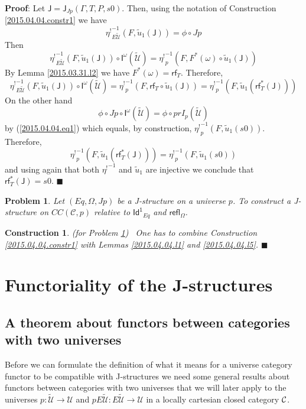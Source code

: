 \documentclass[12pt]{article}
\numberwithin{equation}{section}
\newenvironment{myproof}{{\bf Proof}:}{$\blacksquare$ \vskip 5mm }
\newtheorem{problem}[proposition]{Problem}
\newtheorem{construction0}[proposition]{Construction}
\newenvironment{construction}[1]{\begin{construction0}(for Problem \ref{#1})\ }{$\blacksquare$ \end{construction0}}
\newcommand{\llabel}[1]{\label{#1}}
\newcommand{\sr}{\rightarrow}
\newcommand{\wt}{\widetilde}
\newcommand{\toCC}{CC} %
\newcommand{\Id}{\mathsf{Id^1}} %
\newcommand{\refl}{\mathsf{refl}}
\newcommand{\J}{\mathsf{J}}
\newcommand{\U}{\mathcal{U}}
\newcommand{\I}{\mathsf{I}}
\newcommand{\rf}{\mathsf{rf}}
\newcommand{\etashriek}{\eta^!}
\newcommand{\etaunshriek}{{\etashriek}^{-1}}
\begin{document}
%
\begin{myproof}
Let $\J=\J_{Jp}(\Gamma,T,P,s0)$. Then, using the notation of Construction
\ref{2015.04.04.constr1} we have
%
$$\etaunshriek_{E\wt{\U}}(F,\wt{u}_1(\J))=\phi\circ Jp$$
%
Then
%
$$\etaunshriek_{E\wt{\U}}(F,\wt{u}_1(\J))\circ
\I^{\omega}(\wt{\U})=\etaunshriek_p(F,F^*(\omega)\circ \wt{u}_1(\J))$$
%
By Lemma \ref{2015.03.31.l2} we have $F^*(\omega)=\rf_T$. Therefore,
%
$$\etaunshriek_{E\wt{\U}}(F,\wt{u}_1(\J))\circ \I^{\omega}(\wt{\U})=\etaunshriek_p(F,\rf_T\circ
\wt{u}_1(\J))=\etaunshriek_p(F,\wt{u}_1(\rf_T^*(\J)))$$
%
On the other hand
%
$$\phi\circ Jp\circ \I^{\omega}(\wt{\U})=\phi\circ prI_p(\wt{\U})$$
%
by (\ref{2015.04.04.eq1}) which equals, by construction,
$\etaunshriek_p(F,\wt{u}_1(s0))$. Therefore,
%
$$\etaunshriek_p(F,\wt{u}_1(\rf_T^*(\J)))=\etaunshriek_p(F,\wt{u}_1(s0))$$
%
and using again that both $\etaunshriek$ and $\wt{u}_1$ are injective we conclude that
$\rf_T^*(\J)=s0$.
\end{myproof}
%
\begin{problem}
\llabel{2015.04.04.prob2} Let $(Eq,\Omega,Jp)$ be a J-structure on a universe
$p$. To construct a J-structure on $\toCC({\mathcal C},p)$ relative to $\Id_{Eq}$
and $\refl_{\Omega}$.
\end{problem} 
%
\begin{construction}{2015.04.04.prob2}\rm
\llabel{2015.04.04.constr2} One has to combine Construction
\ref{2015.04.04.constr1} with Lemmas \ref{2015.04.04.l1} and
\ref{2015.04.04.l5}.
\end{construction}
%





\section{Functoriality of the J-structures}




\subsection{A theorem about functors between categories with two universes}
\llabel{twouniv}
%
Before we can formulate the definition of what it means for a universe category
functor to be compatible with J-structures we need some general results about
functors between categories with two universes that we will later apply to the
universes $p:\wt{\U}\sr \U$ and $pE\wt{\U}:E\wt{\U}\sr \U$ in a locally cartesian
closed category $\cal C$.
\end{document}
